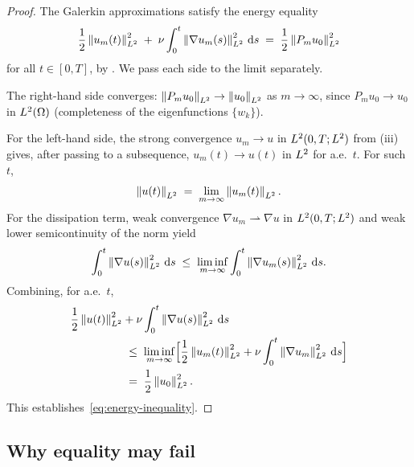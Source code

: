 \begin{proof}
  The Galerkin approximations satisfy the energy equality
  \[
    \frac{1}{2}\left\lVert u_{m}(t) \right\rVert_{L^{2}}^{2}
    \;+\;
    \nu \int_{0}^{t} \left\lVert \nabla u_{m}(s) \right\rVert_{L^{2}}^{2} \,\mathrm{d} s
    \;=\;
    \frac{1}{2}\left\lVert P_{m} u_{0} \right\rVert_{L^{2}}^{2}
  \]
  for all $t \in [0, T]$, by .  We pass each side to the
  limit separately.

  The right-hand side converges: $\left\lVert P_{m} u_{0} \right\rVert_{L^{2}} \to
  \left\lVert u_{0} \right\rVert_{L^{2}}$ as $m \to \infty$, since $P_{m} u_{0} \to u_{0}$ in
  $L^{2}(\Omega)$ (completeness of the eigenfunctions $\{w_{k}\}$).

  For the left-hand side, the strong convergence $u_{m} \to u$ in
  $L^{2}(0,T;L^{2})$ from (iii) gives,
  after passing to a subsequence, $u_{m}(t) \to u(t)$ in $L^{2}$ for
  a.e.\ $t$.  For such $t$,
  \[
    \left\lVert u(t) \right\rVert_{L^{2}}
    \;=\;
    \lim_{m \to \infty} \left\lVert u_{m}(t) \right\rVert_{L^{2}}.
  \]
  For the dissipation term, weak convergence
  $\nabla u_{m} \rightharpoonup \nabla u$ in $L^{2}(0, T; L^{2})$ and
  weak lower semicontinuity of the norm yield
  \[
    \int_{0}^{t} \left\lVert \nabla u(s) \right\rVert_{L^{2}}^{2} \,\mathrm{d} s
    \;\le\;
    \liminf_{m \to \infty}
    \int_{0}^{t} \left\lVert \nabla u_{m}(s) \right\rVert_{L^{2}}^{2} \,\mathrm{d} s.
  \]
  Combining, for a.e.\ $t$,
  \begin{align*}
    \frac{1}{2}\left\lVert u(t) \right\rVert_{L^{2}}^{2}
    &+ \nu \int_{0}^{t}\left\lVert \nabla u(s) \right\rVert_{L^{2}}^{2}\,\mathrm{d} s \\
    &\;\le\;
    \liminf_{m \to \infty}\Bigl[
    \frac{1}{2}\left\lVert u_{m}(t) \right\rVert_{L^{2}}^{2}
    + \nu \int_{0}^{t}\left\lVert \nabla u_{m} \right\rVert_{L^{2}}^{2}\,\mathrm{d} s\Bigr] \\
    &\;=\;
    \frac{1}{2}\left\lVert u_{0} \right\rVert_{L^{2}}^{2}.
  \end{align*}
  This establishes~\eqref{eq:energy-inequality}.
\end{proof}

\subsection{Why equality may fail}

